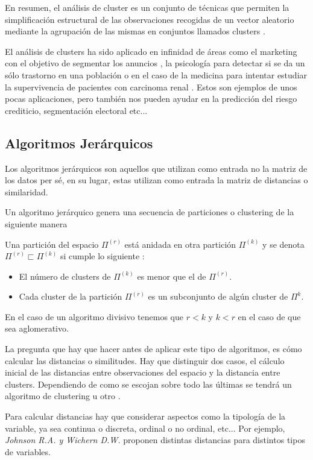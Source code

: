 \noindent En resumen, el análisis de cluster es un conjunto de técnicas que permiten la simplificación estructural de las observaciones recogidas de un vector aleatorio mediante la agrupación de las mismas en conjuntos llamados clusters \cite{Everitt 2011}. 

\noindent El análisis de clusters ha sido aplicado en infinidad de áreas como el marketing con el objetivo de segmentar los anuncios \cite{Okazaki 2006}, la psicología para detectar si se da un sólo trastorno en una población \cite{Everitt 2002} o en el caso de la medicina para intentar estudiar la supervivencia de pacientes con carcinoma renal \cite{Witten 2010}. Estos son ejemplos de unos pocas aplicaciones, pero también nos pueden ayudar en la predicción del riesgo crediticio, segmentación electoral etc... 
\subsection{Algoritmos Jerárquicos}

\noindent Los algoritmos jerárquicos son aquellos que utilizan como entrada no la matriz de los datos per sé, en su lugar, estas utilizan como entrada la matriz de distancias o similaridad.

\noindent Un algoritmo jerárquico genera una secuencia de particiones o clustering de la siguiente manera 
\begin{defi}
Una partición del espacio $\Pi^{(r)}$ está anidada en otra partición $\Pi^{(k)}$ y se denota $\Pi^{(r)} \sqsubset \Pi^{(k)}$ si cumple lo siguiente \cite{Scitovski 2021} :
\begin{itemize}
\item El número de clusters de $\Pi^{(k)}$ es menor que el de $\Pi^{(r)}$. 
\item Cada cluster de la partición $\Pi^{(r)}$ es un subconjunto de algún cluster de $\Pi^{k}$. 
\end{itemize}
En el caso de un algoritmo divisivo tenemos que $r<k$ y $k<r$ en el caso de que sea aglomerativo. 
\end{defi}

\noindent La pregunta que hay que hacer antes de aplicar este tipo de algoritmos, es cómo calcular las distancias o similitudes. Hay que distinguir dos casos, el cálculo inicial de las distancias entre observaciones del espacio y la distancia entre clusters. Dependiendo de como se escojan sobre todo las últimas se tendrá un algoritmo de clustering u otro \cite{Peña 2002}. 

\noindent Para calcular distancias hay que considerar aspectos como la tipología de la variable, ya sea continua o discreta, ordinal o no ordinal, etc... Por ejemplo, \emph{Johnson R.A. y Wichern D.W. }\cite{Johnson 2007} proponen distintas distancias para distintos tipos de variables. 

